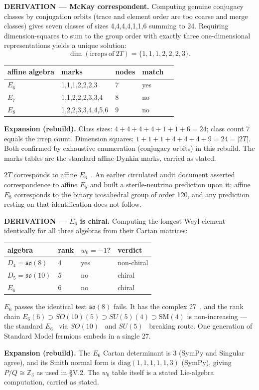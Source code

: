 \documentclass[11pt,a4paper]{article}
\newcommand{\expansion}[1]{\par\smallskip\noindent\textbf{Expansion (rebuild).} #1\par\smallskip}
\begin{document}
\textbf{DERIVATION --- McKay correspondent.} Computing genuine conjugacy classes by conjugation orbits (trace and element order are too coarse and merge classes) gives seven classes of sizes 4,4,4,4,1,1,6 summing to 24. Requiring dimension-squares to sum to the group order with exactly three one-dimensional representations yields a unique solution:
\begin{equation}
\dim(\mathrm{irreps\ of\ } 2T) = \{1, 1, 1, 2, 2, 2, 3\}.
\end{equation}
\begin{center}
\begin{tabular}{lllll}
\toprule
affine algebra & marks & nodes & match \\
\midrule
$E_6$ & 1,1,1,2,2,2,3 & 7 & yes \\
$E_7$ & 1,1,2,2,2,3,3,4 & 8 & no \\
$E_8$ & 1,2,2,3,3,4,4,5,6 & 9 & no \\
\bottomrule
\end{tabular}
\end{center}
\expansion{Class sizes: $4+4+4+4+1+1+6 = 24$; class count 7 equals the irrep count. Dimension squares: $1+1+1+4+4+4+9 = 24 = |2T|$. Both confirmed by exhaustive enumeration (conjugacy orbits) in this rebuild. The marks tables are the standard affine-Dynkin marks, carried as stated.}
$2T$ corresponds to affine $E_6$~\cite{mckay1980}. An earlier circulated audit document asserted correspondence to affine $E_8$ and built a sterile-neutrino prediction upon it; affine $E_8$ corresponds to the binary icosahedral group of order 120, and any prediction resting on that identification does not follow.

\textbf{DERIVATION --- $E_6$ is chiral.} Computing the longest Weyl element identically for all three algebras from their Cartan matrices:
\begin{center}
\begin{tabular}{llll}
\toprule
algebra & rank & $w_0 = -1$? & verdict \\
\midrule
$D_4 = \mathfrak{so}(8)$ & 4 & yes & non-chiral \\
$D_5 = \mathfrak{so}(10)$ & 5 & no & chiral \\
$E_6$ & 6 & no & chiral \\
\bottomrule
\end{tabular}
\end{center}
$E_6$ passes the identical test $\mathfrak{so}(8)$ fails. It has the complex 27~\cite{slansky1981}, and the rank chain $E_6(6) \supset SO(10)(5) \supset SU(5)(4) \supset \mathrm{SM}(4)$ is non-increasing --- the standard $E_6$~\cite{gursey1976} via $SO(10)$~\cite{fritzsch1975} and $SU(5)$~\cite{georgi1974} breaking route. One generation of Standard Model fermions embeds in a single 27.
\expansion{The $E_6$ Cartan determinant is 3 (SymPy and Singular agree), and its Smith normal form is $\mathrm{diag}(1,1,1,1,1,3)$ (SymPy), giving $P/Q \cong \mathbb{Z}_3$ as used in \S V.2. The $w_0$ table itself is a stated Lie-algebra computation, carried as stated.}
\end{document}
